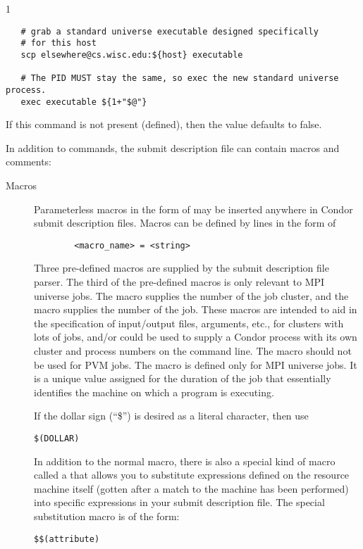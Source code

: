 \begin{ManPage}{\label{man-condor-submit}}{1}
\begin{description}
\begin{verbatim}
   # grab a standard universe executable designed specifically
   # for this host
   scp elsewhere@cs.wisc.edu:${host} executable

   # The PID MUST stay the same, so exec the new standard universe process.
   exec executable ${1+"$@"}
\end{verbatim} 
If this command is not present (defined), then the value
defaults to false.

\end{description}

In addition to commands, the submit description file can contain macros
and comments:

\begin{description}

\item[Macros] Parameterless macros in the form of 
may be inserted anywhere in Condor submit description files. Macros can be
defined by lines in the form of 
\begin{verbatim} 
        <macro_name> = <string> 
\end{verbatim} 
Three pre-defined macros are supplied by the submit description file parser.
The third of the pre-defined macros is only relevant to MPI universe
jobs.
The
 macro supplies the number of the job cluster, and the
 macro supplies the number of the job. These macros are
intended to aid in the specification of input/output files, arguments,
etc., for clusters with lots of jobs, and/or could be used to supply a
Condor process with its own cluster and process numbers on the command
line.  The  macro should not be used for PVM jobs.
The 
 macro is defined only for MPI universe jobs.
It is a unique value assigned for the duration of the job
that essentially identifies the machine on which a program is
executing.

If the dollar sign (``\$'') is desired as a literal character,
then use
\begin{verbatim}
$(DOLLAR)
\end{verbatim}

In addition to the normal macro, there is also a special kind of macro
called a  that allows you to substitute
expressions defined on the resource machine itself (gotten after a match
to the machine has been performed) into specific expressions in your
submit description file. The special substitution macro is of the form:
\begin{verbatim} 
$$(attribute)
\end{verbatim}


\end{description}
\end{ManPage}
